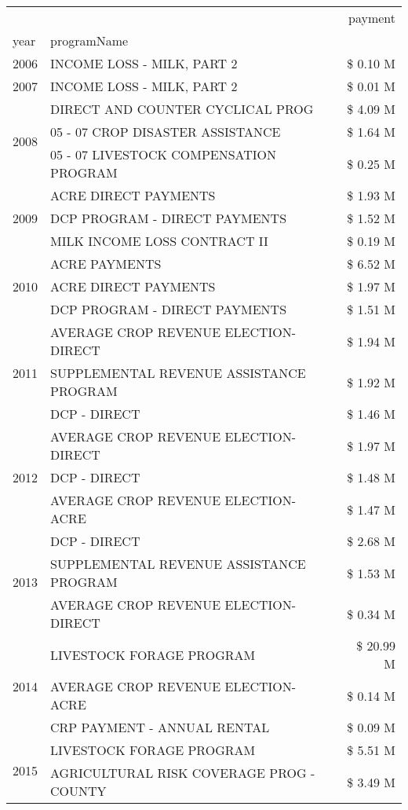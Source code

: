 \begin{tabular}{llr}
\toprule
 &  & payment \\
year & programName &  \\
\midrule
2006 & INCOME LOSS - MILK, PART 2 & \$ 0.10 M \\
\cline{1-3}
2007 & INCOME LOSS - MILK, PART 2 & \$ 0.01 M \\
\cline{1-3}
\multirow[t]{3}{*}{2008} & DIRECT AND COUNTER CYCLICAL PROG & \$ 4.09 M \\
 & 05 - 07 CROP DISASTER ASSISTANCE & \$ 1.64 M \\
 & 05 - 07 LIVESTOCK COMPENSATION PROGRAM & \$ 0.25 M \\
\cline{1-3}
\multirow[t]{3}{*}{2009} & ACRE DIRECT PAYMENTS & \$ 1.93 M \\
 & DCP PROGRAM - DIRECT PAYMENTS & \$ 1.52 M \\
 & MILK INCOME LOSS CONTRACT II & \$ 0.19 M \\
\cline{1-3}
\multirow[t]{3}{*}{2010} & ACRE PAYMENTS & \$ 6.52 M \\
 & ACRE DIRECT PAYMENTS & \$ 1.97 M \\
 & DCP PROGRAM - DIRECT PAYMENTS & \$ 1.51 M \\
\cline{1-3}
\multirow[t]{3}{*}{2011} & AVERAGE CROP REVENUE ELECTION-DIRECT & \$ 1.94 M \\
 & SUPPLEMENTAL REVENUE ASSISTANCE PROGRAM & \$ 1.92 M \\
 & DCP - DIRECT & \$ 1.46 M \\
\cline{1-3}
\multirow[t]{3}{*}{2012} & AVERAGE CROP REVENUE ELECTION-DIRECT & \$ 1.97 M \\
 & DCP - DIRECT & \$ 1.48 M \\
 & AVERAGE CROP REVENUE ELECTION-ACRE & \$ 1.47 M \\
\cline{1-3}
\multirow[t]{3}{*}{2013} & DCP - DIRECT & \$ 2.68 M \\
 & SUPPLEMENTAL REVENUE ASSISTANCE PROGRAM & \$ 1.53 M \\
 & AVERAGE CROP REVENUE ELECTION-DIRECT & \$ 0.34 M \\
\cline{1-3}
\multirow[t]{3}{*}{2014} & LIVESTOCK FORAGE PROGRAM & \$ 20.99 M \\
 & AVERAGE CROP REVENUE ELECTION-ACRE & \$ 0.14 M \\
 & CRP PAYMENT - ANNUAL RENTAL & \$ 0.09 M \\
\cline{1-3}
\multirow[t]{3}{*}{2015} & LIVESTOCK FORAGE PROGRAM & \$ 5.51 M \\
 & AGRICULTURAL RISK COVERAGE PROG - COUNTY & \$ 3.49 M \\

\end{tabular}
